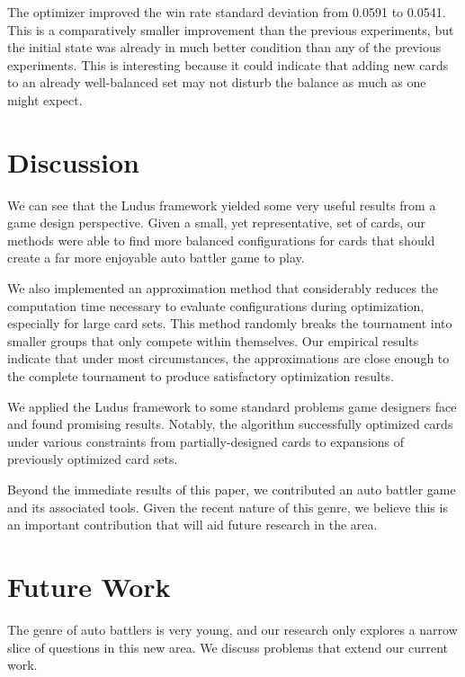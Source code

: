 \documentclass[letterpaper]{article} %
\begin{document}

The optimizer improved the win rate standard deviation from 0.0591 to 0.0541. This is a comparatively smaller improvement than the previous experiments, %
but the initial state was already in much better condition than any of the previous experiments. This is interesting because it could indicate that adding new cards to an already well-balanced set may not disturb the balance as much as one might expect. 

\section{Discussion} \label{sec:discussion}
We can see that the {\sc Ludus} framework yielded some very useful results from a game design perspective. Given a small, yet representative, set of cards, our methods were able to find more balanced configurations for cards that should create a far more enjoyable auto battler game to play.

We also implemented an approximation method that considerably reduces the computation time necessary to evaluate configurations during optimization, especially for large card sets. This method randomly breaks the tournament into smaller groups that only compete within themselves. Our empirical results indicate that under most circumstances, the approximations are close enough to the %
complete tournament to produce satisfactory optimization results. 

We applied the {\sc Ludus} framework to some standard problems game designers face and found promising results. Notably, the algorithm successfully optimized cards under various constraints from partially-designed cards to expansions of %
previously optimized card sets.

Beyond the immediate results of this paper, we contributed an auto battler game and its associated tools. %
Given the recent nature of this genre, we believe this is an important contribution that will aid future research in the area.

\section{Future Work} \label{sec:futurework}
The genre of auto battlers is very young, and our research only explores a narrow slice of questions in this new area. We discuss problems that extend our current work.
\end{document}
